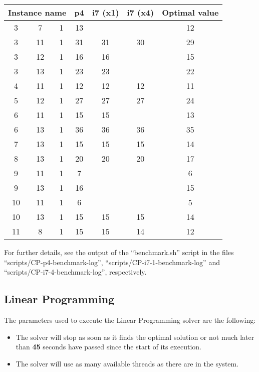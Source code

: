 \begin{table}[H]
\centering
	\begin{tabular}{ccccccc}
		\multicolumn{3}{c}{Instance name}
					& p4		& i7 (x1)	& i7 (x4)	& Optimal value \\
		\midrule
		 3 &  7 & 1	& 13		&  			&  			& 12 \\
		 3 & 11 & 1	& 31		&  31		& 30			& 29 \\
		 3 & 12 & 1	& 16		&  16		&  			& 15 \\
		 3 & 13 & 1	& 23		&  23		&  			& 22 \\
		 4 & 11 & 1	& 12		&  12		& 12			& 11 \\
		 5 & 12 & 1	& 27		&  27		& 27			& 24 \\
		 6 & 11 & 1	& 15		&  15		&  			& 13 \\
		 6 & 13 & 1	& 36		&  36		& 36			& 35 \\
		 7 & 13 & 1	& 15		&  15		& 15			& 14 \\
		 8 & 13 & 1	& 20		&  20		& 20			& 17 \\
		 9 & 11 & 1	&  7		&   			&  			&  6 \\
		 9 & 13 & 1	& 16		&   			&  			& 15 \\
		10 & 11 & 1	&  6		&   			&  			&  5 \\
		10 & 13 & 1	& 15		&  15		& 15			& 14 \\
		11 &  8 & 1	& 15		&  15		& 14			& 12 \\
	\end{tabular}
	\label{table:benchmark:CP-results:suboptimalinstances}
\end{table}

For further details, see the output of the ``benchmark.sh'' script in the files
``scripts/CP-p4-benchmark-log'', ``scripts/CP-i7-1-benchmark-log'' and
``scripts/CP-i7-4-benchmark-log'', respectively.

\subsection{Linear Programming}
\label{sec:benchmarking:linear-programming}

The parameters used to execute the Linear Programming solver are the following:
\begin{itemize}
	\item The solver will stop as soon as it finds the optimal solution or not much
	later than \textbf{45} seconds have passed since the start of its execution.
	\item The solver will use as many available threads as there are in the system.
\end{itemize}

